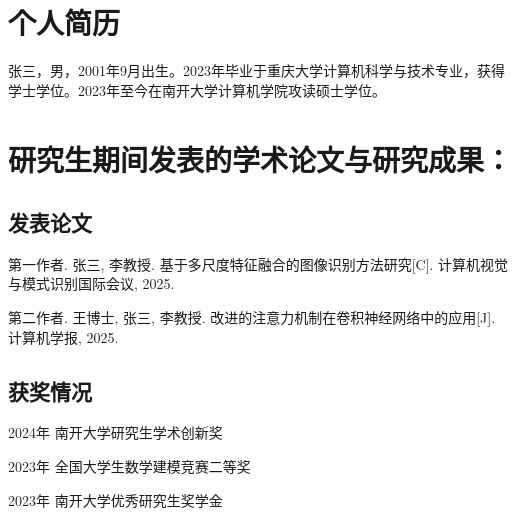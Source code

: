 
\begin{resume}

\section*{个人简历}

张三，男，2001年9月出生。2023年毕业于重庆大学计算机科学与技术专业，获得学士学位。2023年至今在南开大学计算机学院攻读硕士学位。

\section*{{研究生期间发表的学术论文与研究成果：}}


\subsection*{发表论文}

\begin{achievements}
    \item 第一作者. 张三, 李教授. 基于多尺度特征融合的图像识别方法研究[C]. 计算机视觉与模式识别国际会议, 2025.
    \item 第二作者. 王博士, 张三, 李教授. 改进的注意力机制在卷积神经网络中的应用[J]. 计算机学报, 2025.
\end{achievements}

\subsection*{获奖情况}

\begin{achievements}
    \item 2024年 南开大学研究生学术创新奖
    \item 2023年 全国大学生数学建模竞赛二等奖
    \item 2023年 南开大学优秀研究生奖学金
\end{achievements}

\end{resume}


